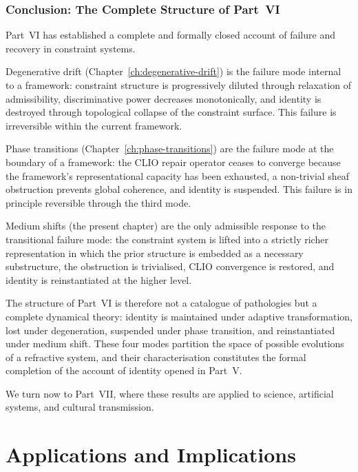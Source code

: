 \documentclass[11pt,openany]{book}
\begin{document}
\section{Conclusion: The Complete Structure of Part~VI}
\label{sec:conclusion-part-vi}

Part~VI has established a complete and formally closed
account of failure and recovery in constraint systems.

Degenerative drift (Chapter~\ref{ch:degenerative-drift})
is the failure mode internal to a framework: constraint
structure is progressively diluted through relaxation of
admissibility, discriminative power decreases
monotonically, and identity is destroyed through
topological collapse of the constraint surface.  This
failure is irreversible within the current framework.

Phase transitions (Chapter~\ref{ch:phase-transitions})
are the failure mode at the boundary of a framework: the
CLIO repair operator ceases to converge because the
framework's representational capacity has been exhausted,
a non-trivial sheaf obstruction prevents global coherence,
and identity is suspended.  This failure is in principle
reversible through the third mode.

Medium shifts (the present chapter) are the only
admissible response to the transitional failure mode: the
constraint system is lifted into a strictly richer
representation in which the prior structure is embedded as
a necessary substructure, the obstruction is trivialised,
CLIO convergence is restored, and identity is reinstantiated
at the higher level.

The structure of Part~VI is therefore not a catalogue of
pathologies but a complete dynamical theory: identity is
maintained under adaptive transformation, lost under
degeneration, suspended under phase transition, and
reinstantiated under medium shift.  These four modes
partition the space of possible evolutions of a refractive
system, and their characterisation constitutes the formal
completion of the account of identity opened in Part~V.

We turn now to Part~VII, where these results are applied
to science, artificial systems, and cultural transmission.


\part{Applications and Implications}
\end{document}
